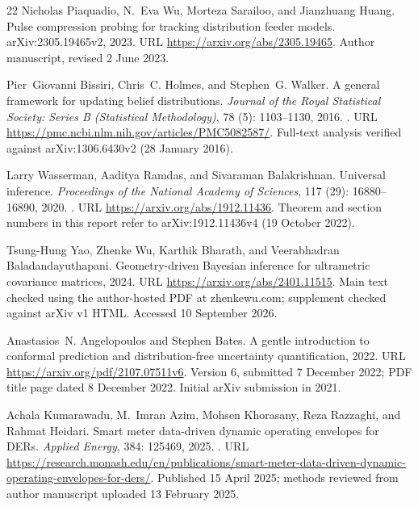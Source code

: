 \documentclass[UTF8,11pt,fontset=fandol,openany,oneside]{ctexbook}
\theoremstyle{definition}
\theoremstyle{remark}
\numberwithin{equation}{chapter}
\begin{document}
\begin{thebibliography}{22}
Nicholas Piaquadio, N.~Eva Wu, Morteza Sarailoo, and Jianzhuang Huang.
\newblock Pulse compression probing for tracking distribution feeder models.
\newblock arXiv:2305.19465v2, 2023.
\newblock URL \url{https://arxiv.org/abs/2305.19465}.
\newblock Author manuscript, revised 2 June 2023.

Pier~Giovanni Bissiri, Chris~C. Holmes, and Stephen~G. Walker.
\newblock A general framework for updating belief distributions.
\newblock \emph{Journal of the Royal Statistical Society: Series B (Statistical
  Methodology)}, 78 (5): 1103--1130, 2016.
\newblock {}.
\newblock URL \url{https://pmc.ncbi.nlm.nih.gov/articles/PMC5082587/}.
\newblock Full-text analysis verified against arXiv:1306.6430v2 (28 January
  2016).

Larry Wasserman, Aaditya Ramdas, and Sivaraman Balakrishnan.
\newblock Universal inference.
\newblock \emph{Proceedings of the National Academy of Sciences}, 117
  (29): 16880--16890, 2020.
\newblock {}.
\newblock URL \url{https://arxiv.org/abs/1912.11436}.
\newblock Theorem and section numbers in this report refer to
  arXiv:1912.11436v4 (19 October 2022).

Tsung-Hung Yao, Zhenke Wu, Karthik Bharath, and Veerabhadran
  Baladandayuthapani.
\newblock Geometry-driven {Bayesian} inference for ultrametric covariance
  matrices, 2024.
\newblock URL \url{https://arxiv.org/abs/2401.11515}.
\newblock Main text checked using the author-hosted PDF at zhenkewu.com;
  supplement checked against arXiv v1 HTML. Accessed 10 September 2026.

Anastasios~N. Angelopoulos and Stephen Bates.
\newblock A gentle introduction to conformal prediction and distribution-free
  uncertainty quantification, 2022.
\newblock URL \url{https://arxiv.org/pdf/2107.07511v6}.
\newblock Version 6, submitted 7 December 2022; PDF title page dated 8 December
  2022. Initial arXiv submission in 2021.

Achala Kumarawadu, M.~Imran Azim, Mohsen Khorasany, Reza Razzaghi, and Rahmat
  Heidari.
\newblock Smart meter data-driven dynamic operating envelopes for {DERs}.
\newblock \emph{Applied Energy}, 384: 125469, 2025.
\newblock {}.
\newblock URL
  \url{https://research.monash.edu/en/publications/smart-meter-data-driven-dynamic-operating-envelopes-for-ders/}.
\newblock Published 15 April 2025; methods reviewed from author manuscript
  uploaded 13 February 2025.


\end{thebibliography}
\end{document}
